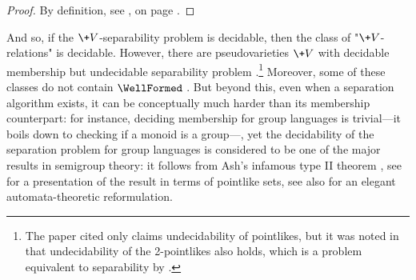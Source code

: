 \begin{proof}
	By definition, see , on page \pageref{fig:projection}.
\end{proof}

And so, if the $\+V$-separability problem is decidable, then the class of "$\+V$-relations"
is decidable. However, there are pseudovarieties $\+V$ with decidable membership but 
undecidable separability problem \cite[Corollary 1.6, p.~478]{rhode_pointlike_2011}.\footnote{The paper cited only claims undecidability of pointlikes, but it was noted in \cite[\S 1, pp.~1--2]{gool_pointlike_2019} that undecidability of the 2-pointlikes also holds, which is a problem 
equivalent to separability by \cite[Proposition 3.4, p.~6]{almeida_algorithmic_1999}.}
Moreover, some of these classes do not contain $\WellFormed$ \cite[Corollary 1.7, p.~478]{rhode_pointlike_2011}. But beyond 
this, even when a separation algorithm exists, it can be conceptually much harder than its
membership counterpart: for instance, deciding membership for group languages is trivial---it boils down to checking if a monoid is a group---, yet the decidability of the 
separation problem for group languages is considered to be one of the major results in semigroup theory:
it follows from Ash's infamous type II theorem \cite[Theorem 2.1, p.~129]{ash_inevitable_1991}, see \cite[Theorem 1.1, p.~3]{henckell_ashs_1991} for a presentation of the result in terms of pointlike sets, see also \cite[\S III, Theorem 8, p.~5]{place_group_2023} for an elegant automata-theoretic reformulation.

